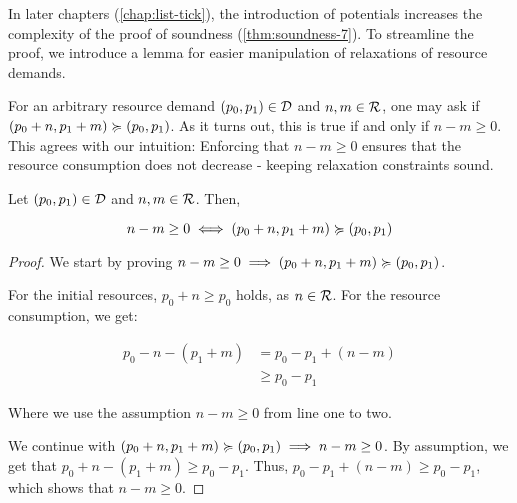 In later chapters (\cref{chap:list-tick}), the introduction of potentials increases the complexity of the proof of soundness (\cref{thm:soundness-7}). To streamline the proof, we introduce a lemma for easier manipulation of relaxations of resource demands.

For an arbitrary resource demand \((p_0, p_1) \in \mathcal{D}\) and \(n, m \in \mathcal{R}\), one may ask if \((p_0 + n, p_1 + m) \succcurlyeq (p_0, p_1)\). As it turns out, this is true if and only if \(n - m \geq 0\). This agrees with our intuition: Enforcing that \(n - m \geq 0\) ensures that the resource consumption does not decrease - keeping relaxation constraints sound.

\begin{lemma}\label{lemma:pos-relaxation}
   Let \((p_0, p_1) \in \mathcal{D}\) and \(n, m \in \mathcal{R}\). Then,

   \[
      n - m \geq 0 \iff (p_0 + n, p_1 + m) \succcurlyeq (p_0, p_1)
   \]
\end{lemma}

\begin{proof}
   We start by proving \(n - m \geq 0 \implies (p_0 + n, p_1 + m) \succcurlyeq (p_0, p_1)\).

   For the initial resources, \(p_0 + n \geq p_0\) holds, as \(n \in \mathcal{R}\). For the resource consumption, we get:

   \begin{align*}
      p_0 - n - (p_1 + m)  & = p_0 - p_1 + (n - m) \\
                           & \geq p_0 - p_1
   \end{align*}

   Where we use the assumption \(n - m \geq 0\) from line one to two. 


   We continue with \((p_0 + n, p_1 + m) \succcurlyeq (p_0, p_1) \implies n - m \geq 0\). By assumption,  we get that \(p_0 + n - (p_1 + m) \geq p_0 - p_1\). Thus, \(p_0 - p_1 + (n - m) \geq p_0 - p_1\), which shows that \(n - m \geq 0\). 
\end{proof}

